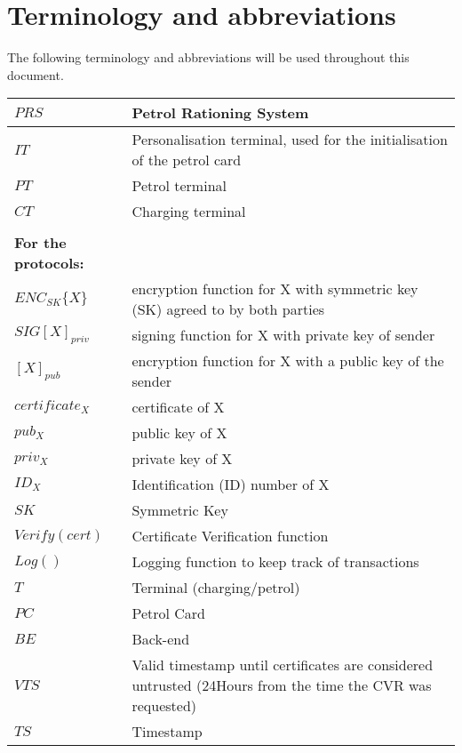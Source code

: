 \section{Terminology and abbreviations}
The following terminology and abbreviations will be used throughout this document. 
    \begin{center}
        \begin{tabular}{| l | p{8cm} |}
            \hline
            $PRS$ & Petrol Rationing System\\\hline
            $IT$ & Personalisation terminal, used for the initialisation of the petrol card \\\hline
            $PT$ & Petrol terminal \\\hline
            $CT$ & Charging terminal \\\hline
            &\\\hline
            \textbf{For the protocols:} &\\\hline
            $ENC_{SK}\{X\}$ & encryption function for X with symmetric key (SK) agreed to by both parties\\ \hline
            $SIG[X]_{priv}$ & signing function for X with private key of sender \\ \hline
            $[X]_{pub}$ & encryption function for X with a public key of the sender \\ \hline
            $certificate_{X}$ & certificate of X \\ \hline
            $pub_{X}$ & public key of X \\ \hline
            $priv_{X}$ & private key of X  \\ \hline
            $ID_{X}$ & Identification (ID) number of X \\ \hline
            $SK$ & Symmetric Key \\ \hline
            $Verify(cert)$ & Certificate Verification function\\ \hline
            $Log()$ & Logging function to keep track of transactions \\ \hline
            $T$ & Terminal (charging/petrol) \\ \hline
            $PC$ & Petrol Card \\ \hline
            $BE$ & Back-end \\ \hline
            $VTS$ & Valid timestamp until certificates are considered untrusted (24Hours from the time the CVR was requested) \\ \hline
            $TS$ & Timestamp \\ \hline

\end{tabular}
\end{center}
